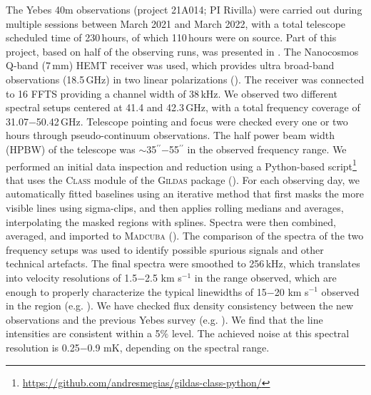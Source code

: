\documentclass[twocolumn]{aastex63}
\begin{document}
The Yebes 40m observations (project 21A014; PI Rivilla) were carried out
during multiple sessions between March 2021 and March 2022, with a total telescope scheduled time of 230\,hours, of which 110\,hours were on source.
Part of this project, based on half of the observing runs, was presented in \citet{rivilla2022a,rivilla2022b}.
The Nanocosmos Q-band (7\,mm) HEMT receiver was used, which provides ultra broad-band observations (18.5\,GHz) in two linear polarizations (\citealt{tercero2021}). The receiver was connected to 16 FFTS providing a channel width of 38\,kHz. 
We observed two different spectral setups centered at 41.4 and 42.3\,GHz, with a total frequency coverage of 31.07$-$50.42\,GHz. 
Telescope pointing and focus were checked every one or two hours through pseudo-continuum observations.
The half power beam width (HPBW) of the telescope was $\sim$35$^{\prime\prime}$$-$55$^{\prime\prime}$ in the observed frequency range.
We performed an initial data inspection and reduction using a Python-based script\footnote{\url{https://github.com/andresmegias/gildas-class-python/}} that uses the \textsc{Class} module of the \textsc{Gildas} package (\citealt{megias2023}).
For each observing day, we automatically fitted baselines using an iterative method that first masks the more visible lines using sigma-clips, and then applies rolling medians and averages, interpolating the masked regions with splines. Spectra were then combined, averaged, and imported to \textsc{Madcuba} (\citealt{martin2019}).
The comparison of the spectra of the two frequency setups was used to identify possible spurious signals and other technical artefacts. 
The final spectra were smoothed to 256\,kHz, which translates into velocity resolutions of 1.5$-$2.5 km s$^{-1}$ in the range observed, which are enough to properly characterize the typical linewidths of 15$-$20 km s$^{-1}$ observed in the region (e.g. \citealt{requena-torres_organic_2006,zeng2018,rivilla2022c}).
We have checked flux density consistency between the new observations and the previous Yebes survey (e.g. \citealt{zeng2020,rodriguez-almeida2021a}). We find that the line intensities are consistent within a 5$\%$ level. The achieved noise at this spectral resolution is 0.25$-$0.9 mK, depending on the spectral range.
\end{document}
